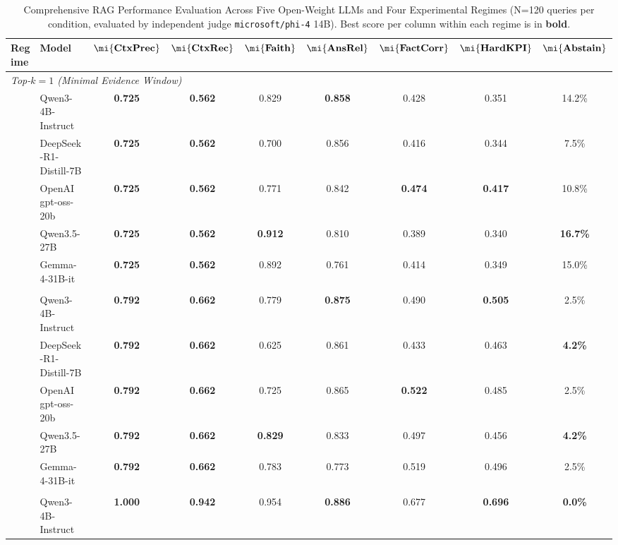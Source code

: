 \begin{table}[t]
\centering
\caption{Comprehensive RAG Performance Evaluation Across Five Open-Weight LLMs and Four Experimental Regimes (N=120 queries per condition, evaluated by independent judge \texttt{microsoft/phi-4} 14B). Best score per column within each regime is in \textbf{bold}.}
\label{tab:master_results}
\footnotesize
\begin{tabular}{llccccccc}
\toprule
\textbf{Regime} & \textbf{Model} & $\mathbf{\mi{CtxPrec}}$ & $\mathbf{\mi{CtxRec}}$ & $\mathbf{\mi{Faith}}$ & $\mathbf{\mi{AnsRel}}$ & $\mathbf{\mi{FactCorr}}$ & $\mathbf{\mi{HardKPI}}$ & $\mathbf{\mi{Abstain}}$ \\
\midrule
\multicolumn{9}{l}{\textit{Top-$k=1$ (Minimal Evidence Window)}} \\
 & Qwen3-4B-Instruct & \textbf{0.725} & \textbf{0.562} & 0.829 & \textbf{0.858} & 0.428 & 0.351 & 14.2\% \\
 & DeepSeek-R1-Distill-7B & \textbf{0.725} & \textbf{0.562} & 0.700 & 0.856 & 0.416 & 0.344 & 7.5\% \\
 & OpenAI gpt-oss-20b & \textbf{0.725} & \textbf{0.562} & 0.771 & 0.842 & \textbf{0.474} & \textbf{0.417} & 10.8\% \\
 & Qwen3.5-27B & \textbf{0.725} & \textbf{0.562} & \textbf{0.912} & 0.810 & 0.389 & 0.340 & \textbf{16.7\%} \\
 & Gemma-4-31B-it & \textbf{0.725} & \textbf{0.562} & 0.892 & 0.761 & 0.414 & 0.349 & 15.0\% \\
\addlinespace[3pt]
\multicolumn{9}{l}{\textit{Top-$k=3$ (Multi-Chunk Fusion)}} \\
 & Qwen3-4B-Instruct & \textbf{0.792} & \textbf{0.662} & 0.779 & \textbf{0.875} & 0.490 & \textbf{0.505} & 2.5\% \\
 & DeepSeek-R1-Distill-7B & \textbf{0.792} & \textbf{0.662} & 0.625 & 0.861 & 0.433 & 0.463 & \textbf{4.2\%} \\
 & OpenAI gpt-oss-20b & \textbf{0.792} & \textbf{0.662} & 0.725 & 0.865 & \textbf{0.522} & 0.485 & 2.5\% \\
 & Qwen3.5-27B & \textbf{0.792} & \textbf{0.662} & \textbf{0.829} & 0.833 & 0.497 & 0.456 & \textbf{4.2\%} \\
 & Gemma-4-31B-it & \textbf{0.792} & \textbf{0.662} & 0.783 & 0.773 & 0.519 & 0.496 & 2.5\% \\
\addlinespace[3pt]
\multicolumn{9}{l}{\textit{Oracle (Gold Source Context Ceiling)}} \\
 & Qwen3-4B-Instruct & \textbf{1.000} & \textbf{0.942} & 0.954 & \textbf{0.886} & 0.677 & \textbf{0.696} & \textbf{0.0\%} \\

\end{tabular}
\end{table}
